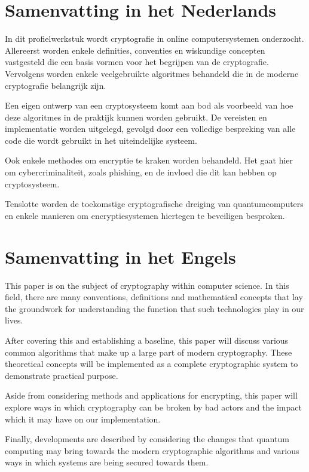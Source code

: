 \documentclass{report} %
\begin{document}
\section{Samenvatting in het Nederlands} %
In dit profielwerkstuk wordt cryptografie in online computersystemen onderzocht. Allereerst worden enkele definities, conventies en wiskundige concepten vastgesteld die een basis vormen voor het begrijpen van de cryptografie. Vervolgens worden enkele veelgebruikte algoritmes behandeld die in de moderne cryptografie belangrijk zijn.
\par Een eigen ontwerp van een cryptosysteem komt aan bod als voorbeeld van hoe deze algoritmes in de praktijk kunnen worden gebruikt. De vereisten en implementatie worden uitgelegd, gevolgd door een volledige bespreking van alle code die wordt gebruikt in het uiteindelijke systeem.
\par Ook enkele methodes om encryptie te kraken worden behandeld. Het gaat hier om cybercriminaliteit, zoals phishing, en de invloed die dit kan hebben op cryptosysteem.
\par Tenslotte worden de toekomstige cryptografische dreiging van quantumcomputers en enkele manieren om encryptiesystemen hiertegen te beveiligen besproken.

\section{Samenvatting in het Engels}
This paper is on the subject of cryptography within computer science. In this field, there are many conventions, definitions and mathematical concepts that lay the groundwork for understanding the function that such technologies play in our lives.
\par After covering this and establishing a baseline, this paper will discuss various common algorithms that make up a large part of modern cryptography. These theoretical concepts will be implemented as a complete cryptographic system to demonstrate practical purpose. 
\par Aside from considering methods and applications for encrypting, this paper will explore ways in which cryptography can be broken by bad actors and the impact which it may have on our implementation.
\par Finally, developments are described by considering the changes that quantum computing may bring towards the modern cryptographic algorithms and various ways in which systems are being secured towards them.
\end{document}
